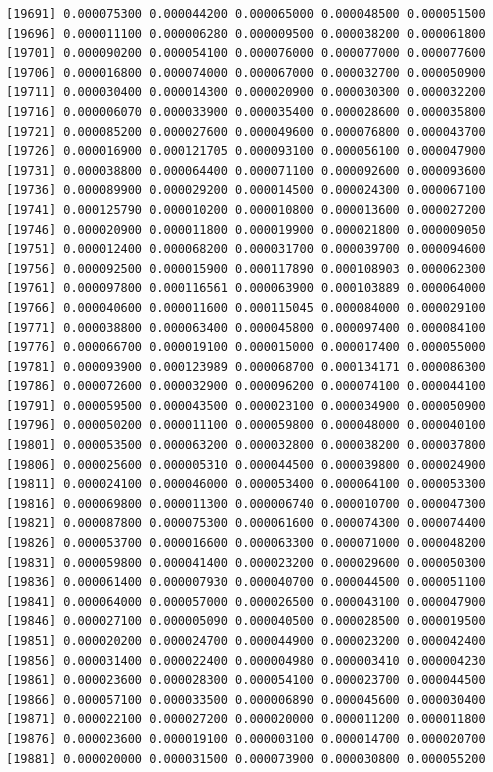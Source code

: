 \documentclass[]{article}
\begin{document}
\begin{verbatim}
[19691] 0.000075300 0.000044200 0.000065000 0.000048500 0.000051500
[19696] 0.000011100 0.000006280 0.000009500 0.000038200 0.000061800
[19701] 0.000090200 0.000054100 0.000076000 0.000077000 0.000077600
[19706] 0.000016800 0.000074000 0.000067000 0.000032700 0.000050900
[19711] 0.000030400 0.000014300 0.000020900 0.000030300 0.000032200
[19716] 0.000006070 0.000033900 0.000035400 0.000028600 0.000035800
[19721] 0.000085200 0.000027600 0.000049600 0.000076800 0.000043700
[19726] 0.000016900 0.000121705 0.000093100 0.000056100 0.000047900
[19731] 0.000038800 0.000064400 0.000071100 0.000092600 0.000093600
[19736] 0.000089900 0.000029200 0.000014500 0.000024300 0.000067100
[19741] 0.000125790 0.000010200 0.000010800 0.000013600 0.000027200
[19746] 0.000020900 0.000011800 0.000019900 0.000021800 0.000009050
[19751] 0.000012400 0.000068200 0.000031700 0.000039700 0.000094600
[19756] 0.000092500 0.000015900 0.000117890 0.000108903 0.000062300
[19761] 0.000097800 0.000116561 0.000063900 0.000103889 0.000064000
[19766] 0.000040600 0.000011600 0.000115045 0.000084000 0.000029100
[19771] 0.000038800 0.000063400 0.000045800 0.000097400 0.000084100
[19776] 0.000066700 0.000019100 0.000015000 0.000017400 0.000055000
[19781] 0.000093900 0.000123989 0.000068700 0.000134171 0.000086300
[19786] 0.000072600 0.000032900 0.000096200 0.000074100 0.000044100
[19791] 0.000059500 0.000043500 0.000023100 0.000034900 0.000050900
[19796] 0.000050200 0.000011100 0.000059800 0.000048000 0.000040100
[19801] 0.000053500 0.000063200 0.000032800 0.000038200 0.000037800
[19806] 0.000025600 0.000005310 0.000044500 0.000039800 0.000024900
[19811] 0.000024100 0.000046000 0.000053400 0.000064100 0.000053300
[19816] 0.000069800 0.000011300 0.000006740 0.000010700 0.000047300
[19821] 0.000087800 0.000075300 0.000061600 0.000074300 0.000074400
[19826] 0.000053700 0.000016600 0.000063300 0.000071000 0.000048200
[19831] 0.000059800 0.000041400 0.000023200 0.000029600 0.000050300
[19836] 0.000061400 0.000007930 0.000040700 0.000044500 0.000051100
[19841] 0.000064000 0.000057000 0.000026500 0.000043100 0.000047900
[19846] 0.000027100 0.000005090 0.000040500 0.000028500 0.000019500
[19851] 0.000020200 0.000024700 0.000044900 0.000023200 0.000042400
[19856] 0.000031400 0.000022400 0.000004980 0.000003410 0.000004230
[19861] 0.000023600 0.000028300 0.000054100 0.000023700 0.000044500
[19866] 0.000057100 0.000033500 0.000006890 0.000045600 0.000030400
[19871] 0.000022100 0.000027200 0.000020000 0.000011200 0.000011800
[19876] 0.000023600 0.000019100 0.000003100 0.000014700 0.000020700
[19881] 0.000020000 0.000031500 0.000073900 0.000030800 0.000055200

\end{verbatim}
\end{document}
